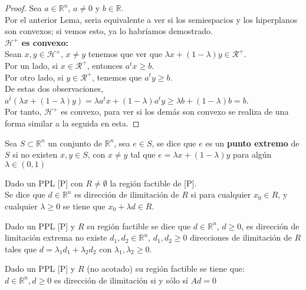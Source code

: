 \documentclass[11pt,fleqn]{book} %
\begin{document}
\begin{proof}
	Sea $a \in \mathbb{R}^n$, $a \neq 0$ y $b \in \mathbb{R}$. \\
	Por el anterior Lema, seria equivalente a ver si los semiespacios y los hiperplanos son convexos; si vemos esto, ya lo habríamos demostrado. \\
	\textbf{$\mathcal{H}^+$ es convexo: } \\
	Sean $x, y  \in \mathcal{H}^+$, $x \neq y$ tenemos que ver que $\lambda x + (1-\lambda)y \in \mathcal{R}^+$. \\
	Por un lado, si $x \in \mathcal{R}^+$, entonces $a^t x \geq b$. \\
	Por otro lado, si $y \in \mathcal{R}^+$, tenemos que $a^t y \geq b$. \\
	De estas dos observaciones, $a^t(\lambda x + (1-\lambda) y )=\lambda a^t x + (1-\lambda)a^t y \geq \lambda b + (1-\lambda ) b =b$. \\
	Por tanto, $\mathcal{H}^+$ es convexo, para ver si los demás son convexo se realiza de una forma similar a la seguida en esta.
\end{proof}

\begin{definition}
	Sea $S \subset \mathbb{R}^n$ un conjunto de $\mathbb{R}^n$, sea $e \in S$, se dice que $e$ es un \textbf{punto extremo} de $S$ si no existen $x , y \in S$, con $x \neq y$ tal que $e= \lambda x + (1-\lambda) y$ para algún $\lambda \in (0, 1)$
\end{definition}

\begin{definition}
	Dado un PPL [P] con $R \neq \emptyset $ la región factible de [P]. \\
	Se dice que $d \in \mathbb{R}^n$ es dirección de ilimitación de $R$ si para cualquier $x_0 \in R$, y cualquier $\lambda \geq 0$ se tiene que $x_0 + \lambda d \in R$.
\end{definition}

\begin{definition}
	Dado un PPL [P] y $R$ su región factible se dice que $d \in \mathbb{R}^n$, $d \geq 0$, es dirección de limitación extrema no existe $d_1, d_2 \in \mathbb{R}^n$, $d_1, d_2 \geq 0$ direcciones de ilimitación de $R$ tales que $d= \lambda_1 d_1+\lambda_2 d_2$ con $\lambda_1, \lambda_2 \geq 0$. 
\end{definition}
	
\begin{proposition}
	Dado un PPL [P] y $R$ (no acotado) su región factible se tiene que: \\
	$d \in \mathbb{R}^n, d \geq 0$ es dirección de ilimitación si y sólo sí $Ad=0$ 
\end{proposition}
\end{document}
